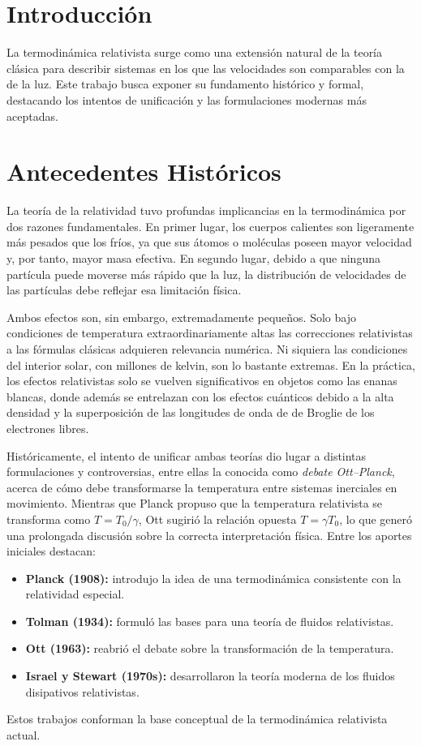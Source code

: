 \section{Introducción}
La termodinámica relativista surge como una extensión natural de la teoría clásica 
para describir sistemas en los que las velocidades son comparables con la de la luz. 
Este trabajo busca exponer su fundamento histórico y formal, destacando los intentos 
de unificación y las formulaciones modernas más aceptadas.

\section{Antecedentes Históricos}
La teoría de la relatividad tuvo profundas implicancias en la termodinámica por dos razones fundamentales. 
En primer lugar, los cuerpos calientes son ligeramente más pesados que los fríos, 
ya que sus átomos o moléculas poseen mayor velocidad y, por tanto, mayor masa efectiva. 
En segundo lugar, debido a que ninguna partícula puede moverse más rápido que la luz, 
la distribución de velocidades de las partículas debe reflejar esa limitación física.

Ambos efectos son, sin embargo, extremadamente pequeños. 
Solo bajo condiciones de temperatura extraordinariamente altas las correcciones relativistas a las fórmulas clásicas adquieren relevancia numérica. Ni siquiera las condiciones del interior solar, con millones de kelvin, son lo bastante extremas. 
En la práctica, los efectos relativistas solo se vuelven significativos en objetos como las enanas blancas, donde además se entrelazan con los efectos cuánticos debido a la alta densidad y la superposición de las longitudes de onda de de Broglie de los electrones libres.

Históricamente, el intento de unificar ambas teorías dio lugar a distintas formulaciones y controversias, entre ellas la conocida como \textit{debate Ott–Planck}, acerca de cómo debe transformarse la temperatura entre sistemas inerciales en movimiento. Mientras que Planck propuso que la temperatura relativista se transforma como $T = T_0 / \gamma$, Ott sugirió la relación opuesta $T = \gamma T_0$, lo que generó una prolongada discusión sobre la correcta interpretación física. Entre los aportes iniciales destacan:
\begin{itemize}
    \item \textbf{Planck (1908):} introdujo la idea de una termodinámica consistente con la relatividad especial.
    \item \textbf{Tolman (1934):} formuló las bases para una teoría de fluidos relativistas.
    \item \textbf{Ott (1963):} reabrió el debate sobre la transformación de la temperatura.
    \item \textbf{Israel y Stewart (1970s):} desarrollaron la teoría moderna de los fluidos disipativos relativistas.
\end{itemize}
Estos trabajos conforman la base conceptual de la termodinámica relativista actual.

